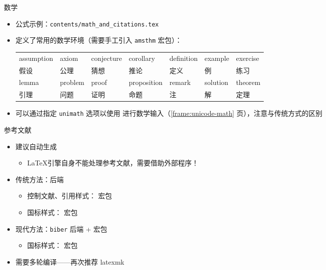 \begin{frame}[fragile]{数学}
  \begin{itemize}
    \item 公式示例：\nolinkurl{contents/math_and_citations.tex}
    \item \SJTUThesis{} 定义了常用的数学环境（需要手工引入 \verb|amsthm| 宏包）：
          \begin{table}[h]
            \centering
            \footnotesize
            \begin{tabular}{*{7}{l}}\toprule
              assumption & axiom    & conjecture & corollary   & definition &
              example    & exercise
              \\
              假设       & 公理     & 猜想       & 推论        & 定义       & 例 & 练习
              \\\midrule
              lemma      & problem  & proof      & proposition & remark     &
              solution   & theorem
              \\
              引理       & 问题     & 证明       & 命题        & 注         & 解 &
              定理
              \\\bottomrule
            \end{tabular}
          \end{table}
    \item \SJTUThesis{} 可以通过指定 \texttt{unimath} 选项以使用 
          进行数学输入（\ref{frame:unicode-math} 页），注意与传统方式的区别
  \end{itemize}
\end{frame}

\begin{frame}[fragile]{参考文献}
  \begin{itemize}
    \item 建议自动生成
          \begin{itemize}
            \item \LaTeX 引擎自身不能处理参考文献，需要借助外部程序！
          \end{itemize}
    \item 传统方法：\BibTeX 后端
          \begin{itemize}
            \item 控制文献、引用样式： 宏包
            \item 国标样式： 宏包
          \end{itemize}
    \item 现代方法：\verb|biber| 后端 +  宏包
          \begin{itemize}
            \item 国标样式： 宏包
          \end{itemize}
    \item 需要多轮编译——再次推荐 latexmk
  \end{itemize}
\end{frame}

